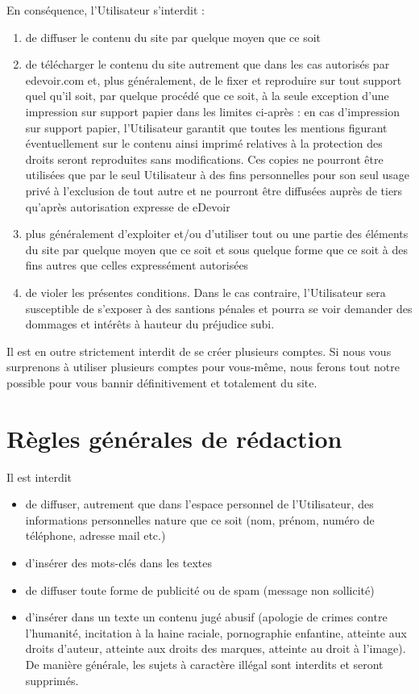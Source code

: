 En conséquence, l'Utilisateur s'interdit :
\begin{enumerate}
   \item de diffuser le contenu du site par quelque moyen que ce soit
   \item de télécharger le contenu du site autrement que dans les cas autorisés par edevoir.com et, plus généralement, de le fixer et reproduire sur tout support quel qu'il soit, par quelque procédé que ce soit, à la seule exception d'une impression sur support papier dans les limites ci-après : en cas d'impression sur support papier, l'Utilisateur garantit que toutes les mentions figurant éventuellement sur le contenu ainsi imprimé relatives à la protection des droits seront reproduites sans modifications. Ces copies ne pourront être utilisées que par le seul Utilisateur à des fins personnelles pour son seul usage privé à l'exclusion de tout autre et ne pourront être diffusées auprès de tiers qu’après autorisation expresse de eDevoir
   \item plus généralement d'exploiter et/ou d'utiliser tout ou une partie des éléments du site par quelque moyen que ce soit et sous quelque forme que ce soit à des fins autres que celles expressément autorisées
   \item de violer les présentes conditions. Dans le cas contraire, l'Utilisateur sera susceptible de s'exposer à des santions pénales et pourra se voir demander des dommages et intérêts à hauteur du préjudice subi.
\end{enumerate}

Il est en outre strictement interdit de se créer plusieurs comptes. Si nous vous surprenons à utiliser plusieurs comptes pour vous-même, nous ferons tout notre possible pour vous bannir définitivement et totalement du site.


\section{Règles générales de rédaction}

Il est interdit
\begin{itemize}
  \item de diffuser, autrement que dans l'espace personnel de l'Utilisateur, des informations personnelles nature que ce soit (nom, prénom, numéro de téléphone, adresse mail etc.)
  \item d'insérer des mots-clés dans les textes
  \item de diffuser toute forme de publicité ou de spam (message non sollicité)
  \item d'insérer dans un texte un contenu jugé abusif (apologie de crimes contre l'humanité, incitation à la haine raciale, pornographie enfantine, atteinte aux droits d'auteur, atteinte aux droits des marques, atteinte au droit à l'image). De manière générale, les sujets à caractère illégal sont interdits et seront supprimés.
\end{itemize}

